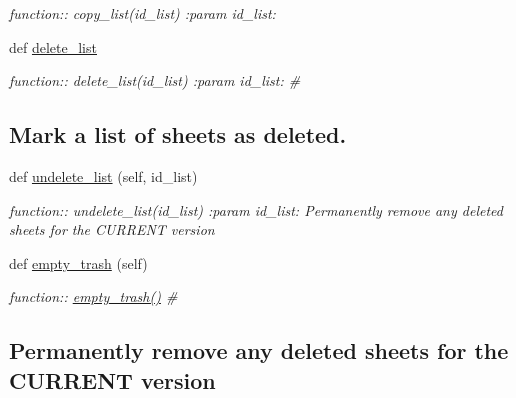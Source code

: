 \begin{DoxyCompactItemize}
\begin{DoxyCompactList}\small\item\em function\+:\+: copy\+\_\+list(id\+\_\+list) \+:param id\+\_\+list\+: \end{DoxyCompactList}\item 
def \hyperlink{classplume-creator_1_1src_1_1plume_1_1data_1_1tree_1_1db__tree_1_1_db_tree_a214b99fbec1a2cf94007cb1c9fc5dfa3}{delete\+\_\+list}
\begin{DoxyCompactList}\small\item\em function\+:\+: delete\+\_\+list(id\+\_\+list) \+:param id\+\_\+list\+: \# \subsection*{Mark a list of sheets as deleted.}\end{DoxyCompactList}\item 
def \hyperlink{classplume-creator_1_1src_1_1plume_1_1data_1_1tree_1_1db__tree_1_1_db_tree_a5455adbc91130e5576a909861e7e3b99}{undelete\+\_\+list} (self, id\+\_\+list)
\begin{DoxyCompactList}\small\item\em function\+:\+: undelete\+\_\+list(id\+\_\+list) \+:param id\+\_\+list\+: Permanently remove any deleted sheets for the C\+U\+R\+R\+E\+NT version \end{DoxyCompactList}\item 
def \hyperlink{classplume-creator_1_1src_1_1plume_1_1data_1_1tree_1_1db__tree_1_1_db_tree_a757b7f0a504bebb56a177a3c33f9a7bf}{empty\+\_\+trash} (self)
\begin{DoxyCompactList}\small\item\em function\+:\+: \hyperlink{classplume-creator_1_1src_1_1plume_1_1data_1_1tree_1_1db__tree_1_1_db_tree_a757b7f0a504bebb56a177a3c33f9a7bf}{empty\+\_\+trash()} \# \subsection*{Permanently remove any deleted sheets for the C\+U\+R\+R\+E\+NT version}


\end{DoxyCompactList}
\end{DoxyCompactItemize}
